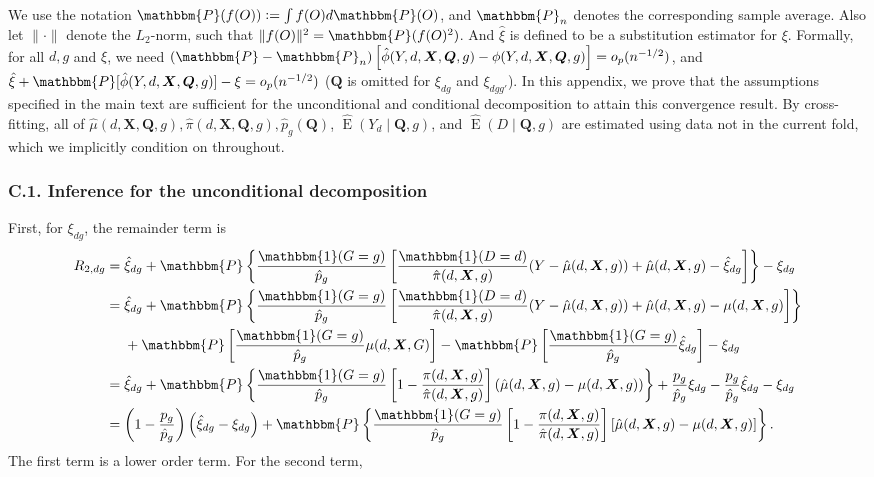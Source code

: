 \documentclass[12pt,a4paper]{article}
\newcommand{\E}{\operatorname{E}}
\def\X{{\boldsymbol X}}
\def\Q{{\boldsymbol Q}}
\def\one{\mathbbm{1}}
\def\P{\mathbbm{P}}
\newcommand{\defeq}{\vcentcolon=}
\begin{document}
We use the notation $\P(f(O)) \defeq \int f(O)d\P(O)$, and $\P_n$ denotes the corresponding sample average. Also let $\| \cdot \|$ denote the $L_2$-norm, such that $\| f(O) \|^2=\P(f(O)^2)$. And $\hat{\xi}$ is defined to be a substitution estimator for $\xi$.
Formally, for all $d,g$ and $\xi$, we need $(\P-\P_n) \left[ \hat{\phi}(Y,d,\X,\Q,g)-\phi(Y,d,\X,\Q,g) \right]=o_p(n^{-1/2})$, 
and $ \hat{\xi} + \P[\hat{\phi}(Y,d,\X,\Q,g)] - \xi =o_p(n^{-1/2})$ ($\Q$ is omitted for $\xi_{dg}$ and $\xi_{dgg'}$). In this appendix, we prove that the assumptions specified in the main text are sufficient for the unconditional and conditional decomposition to attain this convergence result. By cross-fitting, all of $\hat{\mu}(d,\X,\Q,g), \hat{\pi}(d,\X,\Q,g), \hat{p}_g(\Q)$, $\hat{\E}(Y_d \mid \Q,g)$, and $\hat{\E}(D \mid \Q,g)$ are estimated using data not in the current fold, which we implicitly condition on throughout.

\subsubsection*{C.1. Inference for the unconditional decomposition}

First, for $\xi_{dg}$, the remainder term is 
\begin{align*}
    R_{2,dg} &= \hat{\xi}_{dg} + \P\left\{ \frac{\one(G=g)}{\hat{p}_g} \left[ \frac{\one(D=d)}{\hat{\pi}(d, \X,g)} (Y-\hat{\mu}(d,\X,g)) + \hat{\mu}(d,\X,g) - \hat{\xi}_{dg} \right] \right\} - \xi_{dg} 
    \\
    &= \hat{\xi}_{dg} + \P\left\{ \frac{\one(G=g)}{\hat{p}_g} \left[ \frac{\one(D=d)}{\hat{\pi}(d, \X,g)} (Y-\hat{\mu}(d,\X,g)) + \hat{\mu}(d,\X,g) - \mu(d,\X,g) \right] \right\}
    \\
    &\phantom{{}={}} + \P\left[\frac{\one(G=g)}{\hat{p}_g} \mu(d,\X,G)\right] - \P\left[\frac{\one(G=g)}{\hat{p}_g} \hat{\xi}_{dg} \right] - \xi_{dg} 
    \\
    &= \hat{\xi}_{dg} +  \P\left\{ \frac{\one(G=g)}{\hat{p}_g}  \left[1- \frac{\pi(d,\X,g)}{\hat{\pi}(d, \X,g)}\right] \left(\hat{\mu}(d,\X,g) - \mu(d,\X,g)\right) \right\} + \frac{p_g}{\hat{p}_g}\xi_{dg} - \frac{p_g}{\hat{p}_g}\hat{\xi}_{dg} - \xi_{dg} \\
    &= \left(1- \frac{p_g}{\hat{p}_g}\right) \left(\hat{\xi}_{dg} - \xi_{dg}\right) + \P\left\{ \frac{\one(G=g)}{\hat{p}_g}  \left[1- \frac{\pi(d,\X,g)}{\hat{\pi}(d, \X,g)}\right] \left[\hat{\mu}(d,\X,g) - \mu(d,\X,g)\right] \right\}.
\end{align*}
The first term is a lower order term. For the second term,
\end{document}
